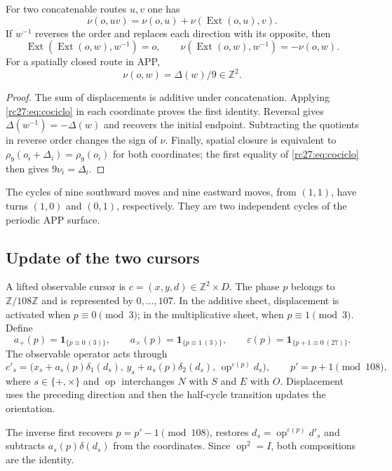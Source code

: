 \begin{proposition}
For two concatenable routes $u,v$ one has
\[
\nu(o,uv)=\nu(o,u)+\nu(\operatorname{Ext}(o,u),v).
\]
If $w^{-1}$ reverses the order and replaces each direction with its
opposite, then
\[
\operatorname{Ext}(\operatorname{Ext}(o,w),w^{-1})=o,
\qquad
\nu(\operatorname{Ext}(o,w),w^{-1})=-\nu(o,w).
\]
For a spatially closed route in APP,
\[
\nu(o,w)=\Delta(w)/9\in\mathbb Z^2.
\]
\end{proposition}
\begin{proof}
The sum of displacements is additive under concatenation. Applying
\eqref{rc27:eq:cociclo} in each coordinate proves the first
identity. Reversal gives $\Delta(w^{-1})=-\Delta(w)$ and recovers
the initial endpoint. Subtracting the quotients in reverse order changes
the sign of $\nu$. Finally, spatial closure is equivalent to
$\rho_9(o_i+\Delta_i)=\rho_9(o_i)$ for both coordinates; the first
equality of \eqref{rc27:eq:cociclo} then gives $9\nu_i=\Delta_i$.
\end{proof}

The cycles of nine southward moves and nine eastward moves,
from $(1,1)$, have turns $(1,0)$ and $(0,1)$, respectively.
They are two independent cycles of the periodic APP surface.

\subsection{Update of the two cursors}

A lifted observable cursor is $c=(x,y,d)\in\mathbb Z^2\times D$.
The phase $p$ belongs to $\mathbb Z/108\mathbb Z$ and is represented
by $0,\ldots,107$. In the additive sheet, displacement is activated
when $p\equiv0\pmod3$; in the multiplicative sheet, when
$p\equiv1\pmod3$. Define
\[
a_+(p)=\mathbf1_{\{p\equiv0\ (3)\}},\qquad
a_\times(p)=\mathbf1_{\{p\equiv1\ (3)\}},\qquad
\varepsilon(p)=\mathbf1_{\{p+1\equiv0\ (27)\}}.
\]
The observable operator acts through
\begin{equation}
c'_s=\bigl(x_s+a_s(p)\delta_1(d_s),\,
           y_s+a_s(p)\delta_2(d_s),\,
           \operatorname{op}^{\varepsilon(p)}d_s\bigr),
\qquad p'=p+1\pmod{108},
\label{rc27:eq:actualizacion}
\end{equation}
where $s\in\{+,\times\}$ and $\operatorname{op}$ interchanges
$N$ with $S$ and $E$ with $O$.
Displacement uses the preceding direction and then the
half-cycle transition updates the orientation.

The inverse first recovers $p=p'-1\pmod{108}$, restores
$d_s=\operatorname{op}^{\varepsilon(p)}d'_s$ and subtracts
$a_s(p)\delta(d_s)$ from the coordinates. Since
$\operatorname{op}^2=I$, both compositions are the identity.

